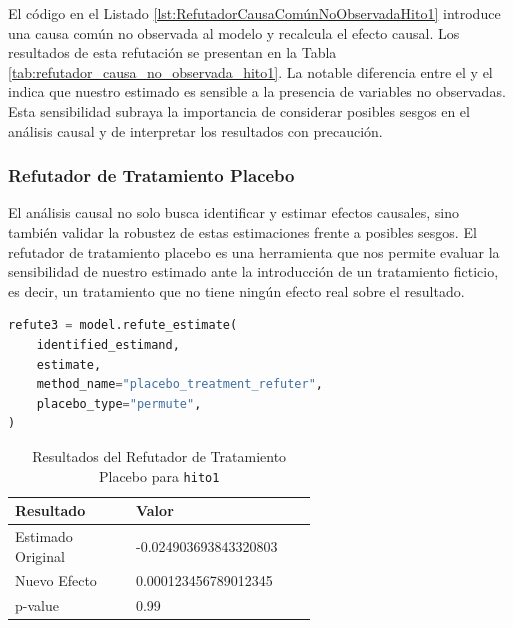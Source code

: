 El código en el Listado \ref{lst:RefutadorCausaComúnNoObservadaHito1} introduce una causa común no observada al modelo y recalcula el efecto causal. Los resultados de esta refutación se presentan en la Tabla \ref{tab:refutador_causa_no_observada_hito1}. La notable diferencia entre el  y el  indica que nuestro estimado es sensible a la presencia de variables no observadas. Esta sensibilidad subraya la importancia de considerar posibles sesgos en el análisis causal y de interpretar los resultados con precaución.


\subsubsection{Refutador de Tratamiento Placebo}

El análisis causal no solo busca identificar y estimar efectos causales, sino también validar la robustez de estas estimaciones frente a posibles sesgos. El refutador de tratamiento placebo es una herramienta que nos permite evaluar la sensibilidad de nuestro estimado ante la introducción de un tratamiento ficticio, es decir, un tratamiento que no tiene ningún efecto real sobre el resultado.

\begin{minipage}{0.5\textwidth}
    \begin{lstlisting}[language=Python, caption=Refutador de tratamiento placebo para \texttt{hito1}, label=lst:RefutadorTratamientoPlaceboHito1]
refute3 = model.refute_estimate(
    identified_estimand,
    estimate,
    method_name="placebo_treatment_refuter",
    placebo_type="permute",
)
\end{lstlisting}
\end{minipage}
\hfill
\begin{minipage}{0.45\textwidth}
    \begin{table}[H]
        \centering
        \begin{tabular}{lp{0.6\linewidth}}
            \toprule
            \textbf{Resultado} & \textbf{Valor} \\
            \midrule
            Estimado Original & -0.024903693843320803 \\
            Nuevo Efecto & 0.000123456789012345 \\
            p-value & 0.99 \\
            \bottomrule
        \end{tabular}
        \caption{Resultados del Refutador de Tratamiento Placebo para \texttt{hito1}}
        \label{tab:refutador_placebo_hito1}
    \end{table}
\end{minipage}

